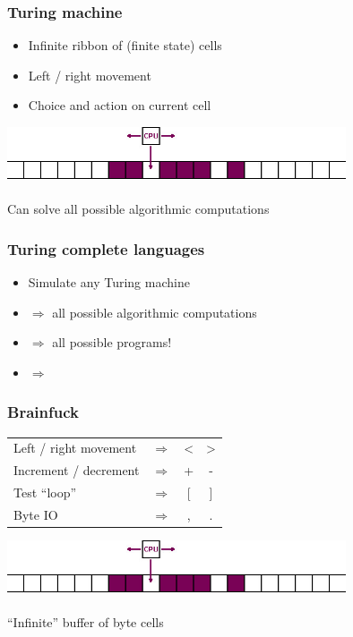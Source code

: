 \documentclass[17pt]{beamer}
\renewcommand{\(}[1]{\begin{columns}[#1]}
\renewcommand{\)}{\end{columns}}
\newcommand{\<}[1]{\begin{column}{#1}}
\renewcommand{\>}{\end{column}}
\begin{document}

\begin{frame}
  \frametitle{Turing machine}
  \begin{itemize}
  \item Infinite ribbon of (finite state) cells
  \item Left / right movement
  \item Choice and action on current cell
  \end{itemize}
  \begin{center}
    \includegraphics[width=10cm]{img/turing}\\~\\
    Can solve all possible algorithmic computations
  \end{center}
\end{frame}




\begin{frame}
  \frametitle{Turing complete languages}
  \begin{itemize}
  \item Simulate any Turing machine
  \item $\Rightarrow$ all possible algorithmic computations
  \pause
  \item $\Rightarrow$ all possible programs!
  \pause
  \item $\Rightarrow$ 
  \end{itemize}
\end{frame}




\begin{frame}
  \frametitle{Brainfuck}
  \begin{center}
    \begin{tabular}{ l c c c }
      Left / right movement & $\Rightarrow$ & < & > \\
      Increment / decrement & $\Rightarrow$ & + & - \\
      Test ``loop'' & $\Rightarrow$ & [ & ] \\
      Byte IO & $\Rightarrow$ & , & .
    \end{tabular}
  \end{center}

  \begin{center}
    \includegraphics[width=10cm]{img/turing}
    ~\\
    ~\\
    ``Infinite'' buffer of byte cells
  \end{center}
\end{frame}
\end{document}
